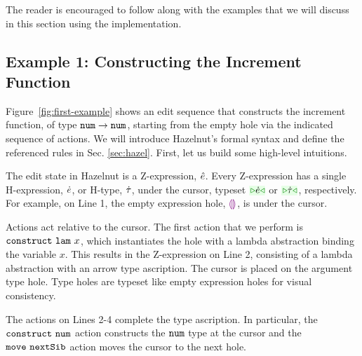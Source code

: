The reader is encouraged to follow along with the examples that we will
discuss in this section using the implementation.

\subsection{Example 1: Constructing the Increment Function}

Figure~\ref{fig:first-example} shows an edit sequence that constructs the
increment function, of type $\texttt{num} \rightarrow \texttt{num}$, starting from the empty
hole via the indicated sequence of {actions}. We will introduce Hazelnut's
formal syntax and define the referenced rules in
Sec. \ref{sec:hazel}. First, let us build some high-level intuitions.

The edit state in Hazelnut is a {Z-expression}, $\hat{e}$. Every Z-expression
has a single {H-expression}, $\dot{e}$, or {H-type}, $\dot{\tau}$, under the
{cursor}, typeset $\zwsel{\hexp}$ or $\zwsel{\htau}$, respectively. For
example, on Line 1, the empty expression hole, $\textcolor{violet}{\llparenthesis}\textcolor{violet}{\rrparenthesis}$, is under the
cursor.

Actions act relative to the cursor. The first action that we perform is
$\mathtt{construct}~\mathtt{lam}~x$, which instantiates the hole with a lambda
abstraction binding the variable $x$. This results in the Z-expression on
Line 2, consisting of a lambda abstraction with an arrow type
ascription. The cursor is placed on the argument type hole. Type holes are
typeset like empty expression holes for visual consistency.

The actions on Lines 2-4 complete the type ascription. In particular, the
$\mathtt{construct}~\mathtt{num}$ action constructs the $\texttt{num}$ type at the cursor and
the $\mathtt{move}~\mathtt{nextSib}$ action moves the cursor to the next hole.

